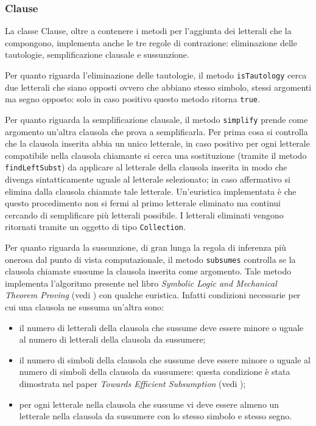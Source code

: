 \documentclass[a4paper,11pt]{article}
\begin{document}
\subsubsection{Clause}
La classe Clause, oltre a contenere i metodi per l'aggiunta dei letterali che la compongono, implementa anche le tre regole di contrazione: eliminazione delle tautologie, semplificazione clausale e sussunzione.\par
Per quanto riguarda l'eliminazione delle tautologie, il metodo \texttt{isTautology} cerca due letterali che siano opposti ovvero che abbiano stesso simbolo, stessi argomenti ma segno opposto: solo in caso positivo questo metodo ritorna \texttt{true}.\par
Per quanto riguarda la semplificazione clausale, il metodo \texttt{simplify} prende come argomento un'altra clausola che prova a semplificarla. Per prima cosa si controlla che la clausola inserita abbia un unico letterale, in caso positivo per ogni letterale compatibile nella clausola chiamante si cerca una sostituzione (tramite il metodo \texttt{findLeftSubst}) da applicare al letterale della clausola inserita in modo che divenga sintatticamente uguale al letterale selezionato; in caso affermativo si elimina dalla clausola chiamate tale letterale. Un'euristica implementata è che questo procedimento non si fermi al primo letterale eliminato ma continui cercando di semplificare più letterali possibile. I letterali eliminati vengono ritornati tramite un oggetto di tipo \texttt{Collection}.\par
Per quanto riguarda la sussunzione, di gran lunga la regola di inferenza più onerosa dal punto di vista computazionale, il metodo \texttt{subsumes} controlla se la clausola chiamate sussume la clausola inserita come argomento. Tale metodo implementa l'algoritmo presente nel libro \emph{Symbolic Logic and Mechanical Theorem Proving} (vedi \cite{ChangLee}) con qualche euristica. Infatti condizioni necessarie per cui una clausola ne sussuma un'altra sono:
\begin{itemize}
\item il numero di letterali della clausola che sussume deve essere minore o uguale al numero di letterali della clausola da sussumere;
\item il numero di simboli della clausola che sussume deve essere minore o uguale al numero di simboli della clausola da sussumere: questa condizione è stata dimostrata nel paper \emph{Towards Efficient Subsumption} (vedi \cite{efficientSubsum});
\item per ogni letterale nella clausola che sussume vi deve essere almeno un letterale nella clausola da sussumere con lo stesso simbolo e stesso segno.
\end{itemize}
\end{document}
